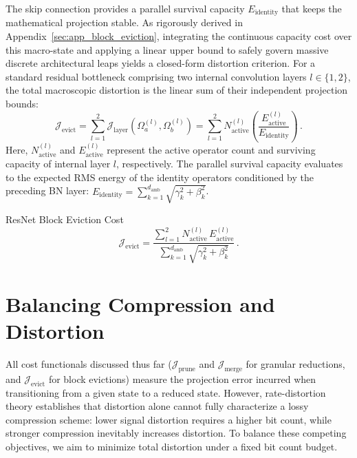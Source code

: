 \documentclass[11pt, a4paper, copyright, gdm]{google}
\newcommand{\calJ}{\mathcal{J}}
\theoremstyle{definition}
\begin{document}
The skip connection provides a parallel survival capacity $E_{\text{identity}}$ that keeps the mathematical projection stable. As rigorously derived in Appendix~\ref{sec:app_block_eviction}, integrating the continuous capacity cost over this macro-state and applying a linear upper bound to safely govern massive discrete architectural leaps yields a closed-form distortion criterion. For a standard residual bottleneck comprising two internal convolution layers $l \in \{1, 2\}$, the total macroscopic distortion is the linear sum of their independent projection bounds:
\begin{equation}
    \calJ_{\text{evict}} = \sum_{l=1}^{2} \calJ_{\text{layer}}(\Omega_a^{(l)}, \Omega_b^{(l)}) = \sum_{l=1}^{2} N_{\text{active}}^{(l)} \left( \frac{E_{\text{active}}^{(l)}}{E_{\text{identity}}} \right) \,.
\end{equation}
Here, $N_{\text{active}}^{(l)}$ and $E_{\text{active}}^{(l)}$ represent the active operator count and surviving capacity of internal layer $l$, respectively. The parallel survival capacity evaluates to the expected RMS energy of the identity operators conditioned by the preceding BN layer: $E_{\text{identity}} = \sum_{k=1}^{d_{\text{amb}}} \sqrt{\gamma_k^2 + \beta_k^2}$.

\begin{insight}{ResNet Block Eviction Cost}
\begin{equation}
    \calJ_{\text{evict}} = \frac{\sum_{l=1}^{2} N_{\text{active}}^{(l)} \, E_{\text{active}}^{(l)}}{\sum_{k=1}^{d_{\text{amb}}} \sqrt{\gamma_k^2 + \beta_k^2}} \,.
\end{equation}
\end{insight}

\section{Balancing Compression and Distortion}
\label{sec:rate_distortion}

All cost functionals discussed thus far ($\calJ_{\text{prune}}$ and $\calJ_{\text{merge}}$ for granular reductions, and $\calJ_{\text{evict}}$ for block evictions) measure the projection error incurred when transitioning from a given state to a reduced state. However, rate-distortion theory establishes that distortion alone cannot fully characterize a lossy compression scheme: lower signal distortion requires a higher bit count, while stronger compression inevitably increases distortion. To balance these competing objectives, we aim to minimize total distortion under a fixed bit count budget.
\end{document}
